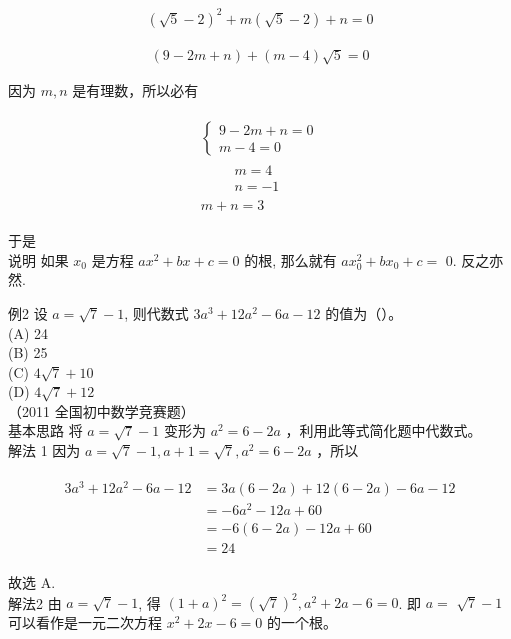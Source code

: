 \documentclass[10pt]{article}
\begin{document}
\begin{align*}
(\sqrt{5}-2)^{2}+m(\sqrt{5}-2)+n=0
\end{align*}

\begin{align*}
(9-2 m+n)+(m-4) \sqrt{5}=0
\end{align*}

因为 $m, n$ 是有理数，所以必有

\begin{align*}
\begin{gathered}
\left\{\begin{array}{l}
9-2 m+n=0 \\
m-4=0
\end{array}\right. \\
\qquad \begin{array}{l}
m=4 \\
n=-1
\end{array} \\
m+n=3
\end{gathered}
\end{align*}

于是\\
说明 如果 $x_{0}$ 是方程 $a x^{2}+b x+c=0$ 的根, 那么就有 $a x_{0}^{2}+b x_{0}+c=$ 0. 反之亦然.

例2 设 $a=\sqrt{7}-1$, 则代数式 $3 a^{3}+12 a^{2}-6 a-12$ 的值为（）。\\
(A) 24\\
(B) 25\\
(C) $4 \sqrt{7}+10$\\
(D) $4 \sqrt{7}+12$\\
（2011 全国初中数学竞赛题）\\
基本思路 将 $a=\sqrt{7}-1$ 变形为 $a^{2}=6-2 a$ ，利用此等式简化题中代数式。\\
解法 1 因为 $a=\sqrt{7}-1, a+1=\sqrt{7}, a^{2}=6-2 a$ ，所以

\begin{align*}
\begin{aligned}
3 a^{3}+12 a^{2}-6 a-12 & =3 a(6-2 a)+12(6-2 a)-6 a-12 \\
& =-6 a^{2}-12 a+60 \\
& =-6(6-2 a)-12 a+60 \\
& =24
\end{aligned}
\end{align*}

故选 A.\\
解法2 由 $a=\sqrt{7}-1$, 得 $(1+a)^{2}=(\sqrt{7})^{2}, a^{2}+2 a-6=0$. 即 $a=$ $\sqrt{7}-1$ 可以看作是一元二次方程 $x^{2}+2 x-6=0$ 的一个根。
\end{document}
